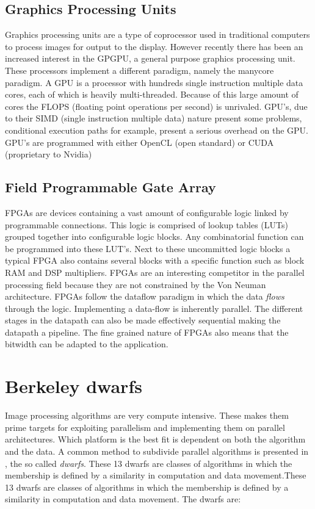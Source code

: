 \subsection{Graphics Processing Units} 
Graphics processing units are a type of coprocessor used in traditional computers to process images for output to the display. However recently there has been an increased interest in the GPGPU, a general purpose graphics processing unit. These processors implement a different paradigm, namely the manycore paradigm. A  GPU is a processor with hundreds single instruction multiple data cores, each of which is heavily multi-threaded. Because of this large amount of cores the FLOPS (floating point operations per second) is unrivaled\cite{kirk_programming_2010}. GPU's, due to their SIMD (single instruction multiple data) nature present some problems, conditional execution paths for example, present a serious overhead on the GPU. GPU's are programmed with either OpenCL (open standard) or CUDA (proprietary to Nvidia)

\subsection{Field Programmable Gate Array} 
FPGAs are devices containing a vast amount of configurable logic linked by programmable connections. This logic is comprised of lookup tables (LUTs) grouped together into configurable logic blocks. Any combinatorial function can be programmed into these LUT's. Next to these uncommitted logic blocks a typical FPGA also contains several blocks with a specific function such as block RAM and DSP multipliers. FPGAs are an interesting competitor in the parallel processing field because they are not constrained by the Von Neuman architecture. FPGAs follow the dataflow paradigm in which the data \emph{flows} through the logic. Implementing a data-flow is inherently parallel. The different stages in the datapath can also be made effectively sequential making the datapath a pipeline. The fine grained nature of FPGAs also means that the bitwidth can be adapted to the application.


\section{Berkeley dwarfs }

Image processing algorithms are very compute intensive. These makes them prime targets for exploiting parallelism and implementing them on parallel architectures. Which platform is the best fit is dependent on both the algorithm and the data. A common method to subdivide parallel algorithms is presented in , the so called \emph{dwarfs}. These 13 dwarfs are classes of algorithms in which the membership is defined by a similarity in computation and data movement.These 13 dwarfs are classes of algorithms in which the membership is defined by a similarity in computation and data movement.
The dwarfs are:

